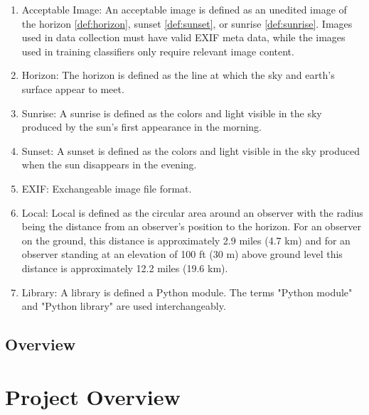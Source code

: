 \documentclass[journal,10pt,draftclsnofoot,onecolumn]{IEEEtran}
\begin{document}
\begin{singlespace}
\begin{enumerate}
			\item \label{def:accImg} Acceptable Image:
			An acceptable image is defined as an unedited image of the horizon \ref{def:horizon}, sunset \ref{def:sunset}, or sunrise \ref{def:sunrise}.
			Images used in data collection must have valid EXIF meta data, while the images used in training classifiers only require relevant image content.

			\item \label{def:horizon} Horizon:
			The horizon is defined as the line at which the sky and earth's surface appear to meet.

			\item \label{def:sunrise} Sunrise:
			A sunrise is defined as the colors and light visible in the sky produced by the sun's first appearance in the morning.

			\item \label{def:sunset} Sunset:
			A sunset is defined as the colors and light visible in the sky produced when the sun disappears in the evening.

			\item \label{def:exif} EXIF:
			Exchangeable image file format.

			\item \label{def:local} Local:
			Local is defined as the circular area around an observer with the radius being the distance from an observer's position to the horizon.
			For an observer on the ground, this distance is approximately 2.9 miles (4.7 km) and for an observer standing at an elevation of 100 ft (30 m) above ground level this distance is approximately 12.2 miles (19.6 km).

			\item \label{def:lib} Library:
			A library is defined a Python module. The terms "Python module" and "Python library" are used interchangeably.
		\end{enumerate}

	\nocite{*}
	
	

	\subsection{Overview}

\clearpage

\section{Project Overview}

\end{singlespace}
\end{document}
